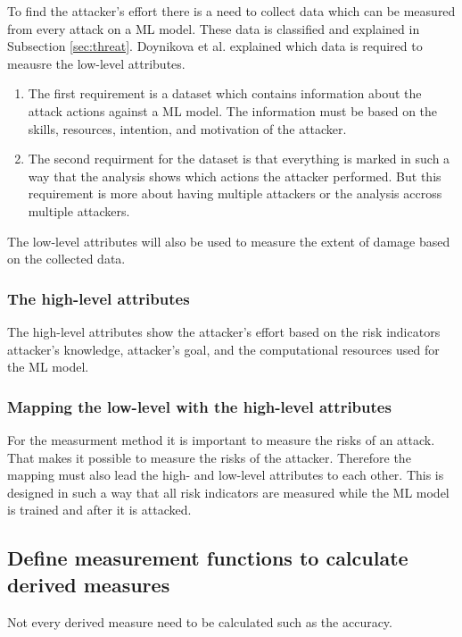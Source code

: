 To find the attacker's effort there is a need to collect data which can be measured from every attack on a ML model. These data is classified and explained in Subsection \ref{sec:threat}. Doynikova et al. explained which data is required to meausre the low-level attributes.

\begin{enumerate}
  \item The first requirement is a dataset which contains information about the attack actions against a ML model. The information must be based on the skills, resources, intention, and motivation of the attacker.
  \item The second requirment for the dataset is that everything is marked in such a way that the analysis shows which actions the attacker performed. But this requirement is more about having multiple attackers or the analysis accross multiple attackers.
\end{enumerate}

The low-level attributes will also be used to measure the extent of damage based on the collected data.

\subsubsection*{The high-level attributes}

The high-level attributes show the attacker's effort based on the risk indicators attacker's knowledge, attacker's goal, and the computational resources used for the ML model.

\subsubsection*{Mapping the low-level with the high-level attributes}

For the measurment method it is important to measure the risks of an attack. That makes it possible to measure the risks of the attacker. Therefore the mapping must also lead the high- and low-level attributes to each other. This is designed in such a way that all risk indicators are measured while the ML model is trained and after it is attacked.

\subsection{Define measurement functions to calculate derived measures}

Not every derived measure need to be calculated such as the accuracy.

